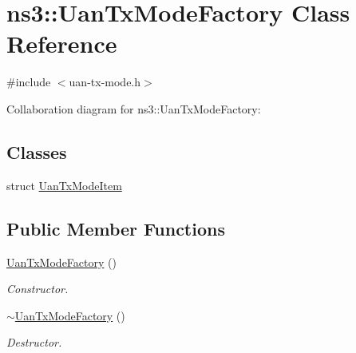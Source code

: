\hypertarget{classns3_1_1UanTxModeFactory}{}\section{ns3\+:\+:Uan\+Tx\+Mode\+Factory Class Reference}
\label{classns3_1_1UanTxModeFactory}


{\ttfamily \#include $<$uan-\/tx-\/mode.\+h$>$}



Collaboration diagram for ns3\+:\+:Uan\+Tx\+Mode\+Factory\+:
\subsection*{Classes}
\begin{DoxyCompactItemize}
\item 
struct \hyperlink{structns3_1_1UanTxModeFactory_1_1UanTxModeItem}{Uan\+Tx\+Mode\+Item}
\end{DoxyCompactItemize}
\subsection*{Public Member Functions}
\begin{DoxyCompactItemize}
\item 
\hyperlink{classns3_1_1UanTxModeFactory_a26e6b61fade79ab1b489d3c48ed06c38}{Uan\+Tx\+Mode\+Factory} ()
\begin{DoxyCompactList}\small\item\em Constructor. \end{DoxyCompactList}\item 
\hyperlink{classns3_1_1UanTxModeFactory_aea7ff48b58502b9c647bc73d85b2b60b}{$\sim$\+Uan\+Tx\+Mode\+Factory} ()
\begin{DoxyCompactList}\small\item\em Destructor. \end{DoxyCompactList}\end{DoxyCompactItemize}
